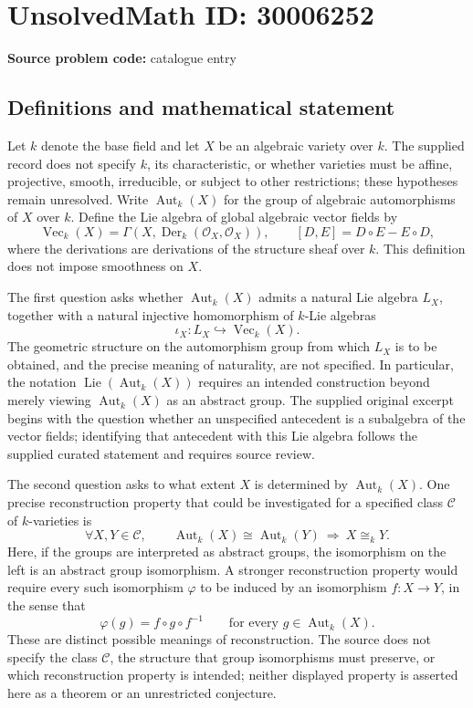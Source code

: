 \documentclass[11pt]{article}
\begin{document}
\section*{UnsolvedMath ID: 30006252}
\textbf{Source problem code:} catalogue entry
\subsection{Definitions and mathematical statement}
Let \(k\) denote the base field and let \(X\) be an algebraic variety over \(k\). The supplied record does not specify \(k\), its characteristic, or whether varieties must be affine, projective, smooth, irreducible, or subject to other restrictions; these hypotheses remain unresolved. Write \(\operatorname{Aut}_k(X)\) for the group of algebraic automorphisms of \(X\) over \(k\). Define the Lie algebra of global algebraic vector fields by
\[
\operatorname{Vec}_k(X)=\Gamma\!\left(X,\operatorname{Der}_k(\mathcal O_X,\mathcal O_X)\right),
\qquad [D,E]=D\circ E-E\circ D,
\]
where the derivations are derivations of the structure sheaf over \(k\). This definition does not impose smoothness on \(X\).

The first question asks whether \(\operatorname{Aut}_k(X)\) admits a natural Lie algebra \(L_X\), together with a natural injective homomorphism of \(k\)-Lie algebras
\[
\iota_X:L_X\hookrightarrow\operatorname{Vec}_k(X).
\]
The geometric structure on the automorphism group from which \(L_X\) is to be obtained, and the precise meaning of naturality, are not specified. In particular, the notation \(\operatorname{Lie}(\operatorname{Aut}_k(X))\) requires an intended construction beyond merely viewing \(\operatorname{Aut}_k(X)\) as an abstract group. The supplied original excerpt begins with the question whether an unspecified antecedent is a subalgebra of the vector fields; identifying that antecedent with this Lie algebra follows the supplied curated statement and requires source review.

The second question asks to what extent \(X\) is determined by \(\operatorname{Aut}_k(X)\). One precise reconstruction property that could be investigated for a specified class \(\mathcal C\) of \(k\)-varieties is
\[
\forall X,Y\in\mathcal C,\qquad
\operatorname{Aut}_k(X)\cong\operatorname{Aut}_k(Y)
\ \Longrightarrow\ X\cong_k Y.
\]
Here, if the groups are interpreted as abstract groups, the isomorphism on the left is an abstract group isomorphism. A stronger reconstruction property would require every such isomorphism \(\varphi\) to be induced by an isomorphism \(f:X\to Y\), in the sense that
\[
\varphi(g)=f\circ g\circ f^{-1}
\qquad\text{for every }g\in\operatorname{Aut}_k(X).
\]
These are distinct possible meanings of reconstruction. The source does not specify the class \(\mathcal C\), the structure that group isomorphisms must preserve, or which reconstruction property is intended; neither displayed property is asserted here as a theorem or an unrestricted conjecture.
\end{document}

